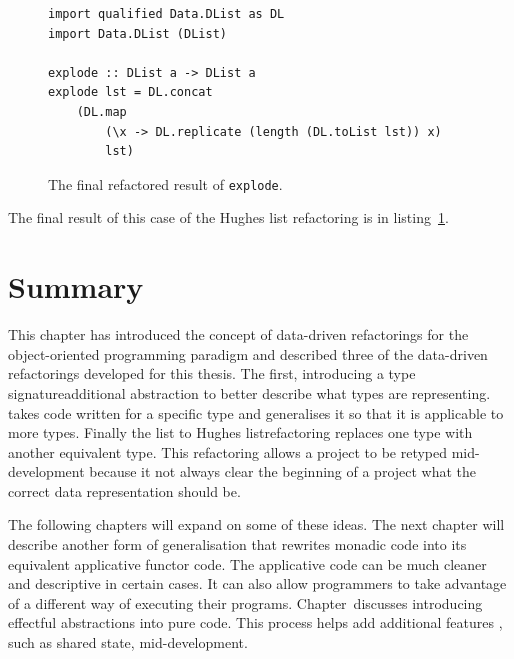 \begin{figure}[t]
\begin{lstlisting}
import qualified Data.DList as DL
import Data.DList (DList)

explode :: DList a -> DList a
explode lst = DL.concat 
	(DL.map 
		(\x -> DL.replicate (length (DL.toList lst)) x) 
		lst)
\end{lstlisting} 
\caption{The final refactored result of \texttt{explode}.}
\label{explodeFinal}
\end{figure}

The final result of this case of the Hughes list refactoring is in listing~\ref{explodeFinal}.

\section{Summary}

This chapter has introduced the concept of data-driven refactorings for the object-oriented programming paradigm and described three of the data-driven refactorings developed for this thesis. The first, \DIFaddbegin {}\DIFaddend introducing a type signature\DIFdelbegin {}\DIFdelend \DIFaddbegin {}\DIFaddend additional abstraction to better describe what types are representing. \DIFdelbegin {}\DIFdelend \DIFaddbegin {}\DIFaddend takes code written for a specific type and generalises it so that it is applicable to more types. Finally the \DIFaddbegin {}\DIFaddend list to Hughes list\DIFaddbegin {}\DIFaddend refactoring replaces one type with another equivalent type. This refactoring allows a project to be retyped mid-development because it \DIFdelbegin {}\DIFdelend \DIFaddbegin {}\DIFaddend not always clear \DIFdelbegin {}\DIFdelend \DIFaddbegin {}\DIFaddend the beginning of a project what the correct data representation should be.

The following chapters will expand on some of these ideas. The next chapter will describe another form of generalisation that rewrites monadic code into its equivalent applicative functor code. The applicative code can be much cleaner and descriptive in certain cases. It can also allow programmers to take advantage of a different way of executing their programs. Chapter~\DIFdelbegin \DIFdel{\ref{chap:monadification} }\DIFdelend \DIFaddbegin \DIFadd{\ref{chp:monadification} }\DIFaddend discusses introducing effectful abstractions into pure code. This process helps \DIFdelbegin {}\DIFdelend \DIFaddbegin {}\DIFaddend add additional features \DIFaddbegin {}\DIFaddend , such as shared state, mid-development.

